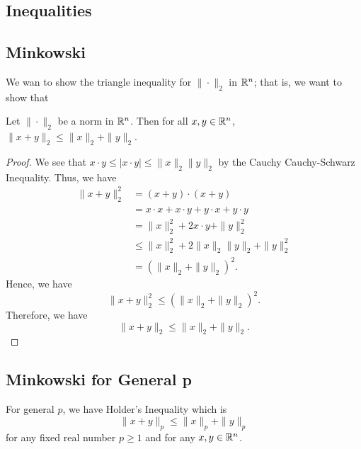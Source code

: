 \documentclass[a4paper]{report}
\begin{document}
\subsection{Inequalities}
    
\subsection{Minkowski}
    We wan to show the triangle inequality for \( \|\cdot\|_2  \) in \( \mathbb{R}^{n} \); that is, we want to show that
    \begin{prop}
         Let \( \|\cdot\|_2 \) be a norm in \( \mathbb{R}^{n} \). Then for all \( x,y \in \mathbb{R}^{n} \), \( \| x + y \|_2 \leq \|x\|_2 + \|y\|_2   \).
    \end{prop}
    \begin{proof}
        We see that \( x \cdot y  \leq | x \cdot y  |  \leq \|x\|_2 \|y\|_2 \) by the Cauchy Cauchy-Schwarz Inequality. Thus, we have
        \begin{align*}
            \|x + y \|_2^{2} &= (x +y) \cdot (x +y) \\
                             &= x \cdot x + x \cdot y + y \cdot x + y \cdot y \\
                             &= \|x\|_2^{2} + 2 x \cdot y + \|y\|_2^{2} \\
                             &\leq \|x\|_2^{2} + 2 \|x\|_2 \|y\|_2 + \|y\|_2^{2} \\
                             &= (\|x\|_2 + \|y\|_2 )^{2}. 
    \end{align*}
    Hence, we have 
    \[  \|x + y\|_2^{2} \leq (\|x\|_2 + \|y\|_2)^{2}.  \]
    Therefore, we have
    \[  \|x  + y\|_2 \leq \|x\|_2 + \|y\|_2. \]
    \end{proof}

\subsection{Minkowski for General p}
For general \( p  \), we have Holder's Inequality which is 
\[  \|x +y\|_p \leq \|x\|_p + \|y\|_p \]
for any fixed real number \( p \geq 1  \) and for any \( x,y \in \mathbb{R}^{n} \).
\end{document}

